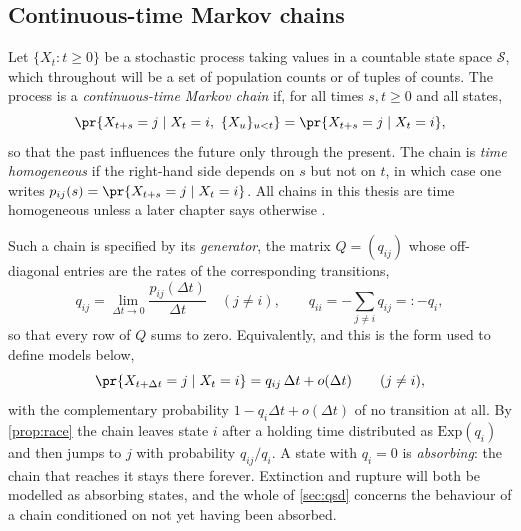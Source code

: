 \subsection{Continuous-time Markov chains}
\label{sec:ctmc}

Let $\{X_t : t\ge0\}$ be a stochastic process taking values in a countable state
space $\mathcal S$, which throughout will be a set of population counts or of
tuples of counts. The process is a \emph{continuous-time Markov chain} if, for all
times $s,t\ge0$ and all states,
\begin{equation}
\label{eq:markov}
\pr{X_{t+s} = j \mid X_t = i,\ \{X_u\}_{u<t}} = \pr{X_{t+s}=j\mid X_t = i},
\end{equation}
so that the past influences the future only through the present. The chain is
\emph{time homogeneous} if the right-hand side depends on $s$ but not on $t$, in
which case one writes $p_{ij}(s) = \pr{X_{t+s}=j\mid X_t=i}$. All chains in this
thesis are time homogeneous unless a later chapter says otherwise
.

Such a chain is specified by its \emph{generator}, the matrix $Q = (q_{ij})$ whose
off-diagonal entries are the rates of the corresponding transitions,
\begin{equation}
\label{eq:generator}
q_{ij} = \lim_{\Delta t\to0}\frac{p_{ij}(\Delta t)}{\Delta t}\quad(j\neq i),
\qquad
q_{ii} = -\sum_{j\neq i}q_{ij} =: -q_i ,
\end{equation}
so that every row of $Q$ sums to zero. Equivalently, and this is the form used to
define models below,
\begin{equation}
\label{eq:infinitesimal}
\pr{X_{t+\Delta t} = j \mid X_t = i} = q_{ij}\,\Delta t + o(\Delta t)
\qquad (j \neq i),
\end{equation}
with the complementary probability $1-q_i\Delta t + o(\Delta t)$ of no transition
at all. By \cref{prop:race} the chain leaves state $i$ after a holding time
distributed as $\mathrm{Exp}(q_i)$ and then jumps to $j$ with probability
$q_{ij}/q_i$. A state with $q_i=0$ is \emph{absorbing}: the chain that reaches it
stays there forever. Extinction and rupture will both be modelled as absorbing
states, and the whole of \cref{sec:qsd} concerns the behaviour of a chain
conditioned on not yet having been absorbed.

